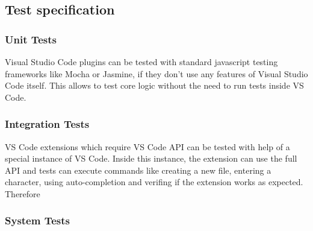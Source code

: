 \subsection{Test specification}

\subsubsection{Unit Tests}
Visual Studio Code plugins can be tested with standard javascript testing frameworks like Mocha or Jasmine, if they don't use any features of Visual Studio Code itself. This allows to test core logic without the need to run tests inside VS Code.


\subsubsection{Integration Tests}
VS Code extensions which require VS Code API can be tested with help of a special instance of VS Code. Inside this instance, the extension can use the full API and tests can execute commands like creating a new file, entering a character, using auto-completion and verifing if the extension works as expected. Therefore  


 

\subsubsection{System Tests}

